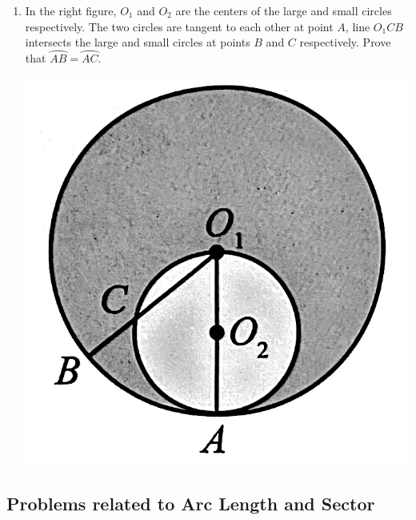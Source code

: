 \documentclass{report}
\begin{document}
\begin{enumerate}
	\item \begin{multicols}{2}
	      In the right figure, $O_1$ and $O_2$ are the centers of the large and small circles respectively. The two circles are tangent to each other at point $A$, line $O_1CB$ intersects the large and small circles at points $B$ and $C$ respectively. Prove that $\wideparen{AB}=\wideparen{AC}$.
	      
	      \begin{center}
	      	\includegraphics[scale=0.14]{assets/8-21.png}
	      \end{center}
	\end{multicols}
\end{enumerate}

\newpage
\subsection*{Problems related to Arc Length and Sector}
\end{document}
